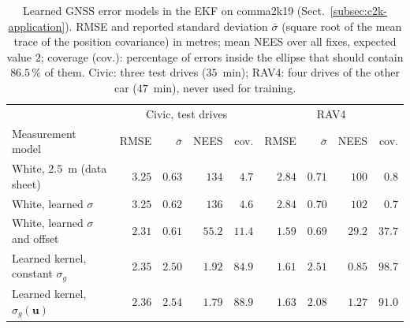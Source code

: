 \documentclass[graybox,envcountchap]{style/SNmono}
\begin{document}
\begin{table}[!t]
\centering
\footnotesize
\setlength{\tabcolsep}{3.5pt}
\caption{Learned GNSS error models in the EKF on comma2k19 (Sect.~\ref{subsec:c2k-application}). RMSE and reported standard deviation $\bar\sigma$ (square root of the mean trace of the position covariance) in metres; mean NEES over all fixes, expected value $2$; coverage (cov.): percentage of errors inside the ellipse that should contain $86.5\,\%$ of them. Civic: three test drives ($35$~min); RAV4: four drives of the other car ($47$~min), never used for training.}
\label{tab:c2k-results}
\begin{tabular}{lrrrrrrrr}
\hline
 & \multicolumn{4}{c}{Civic, test drives} & \multicolumn{4}{c}{RAV4} \\
Measurement model & RMSE & $\bar\sigma$ & NEES & cov. & RMSE & $\bar\sigma$ & NEES & cov. \\
\hline
White, $2.5$~m (data sheet) & $3.25$ & $0.63$ & $134$ & $4.7$ & $2.84$ & $0.71$ & $100$ & $0.8$ \\
White, learned $\sigma$ & $3.25$ & $0.62$ & $136$ & $4.6$ & $2.84$ & $0.70$ & $102$ & $0.7$ \\
White, learned $\sigma$ and offset & $2.31$ & $0.61$ & $55.2$ & $11.4$ & $1.59$ & $0.69$ & $29.2$ & $37.7$ \\
Learned kernel, constant $\sigma_g$ & $2.35$ & $2.50$ & $1.92$ & $84.9$ & $1.61$ & $2.51$ & $0.85$ & $98.7$ \\
Learned kernel, $\sigma_g(\mathbf{u})$ & $2.36$ & $2.54$ & $1.79$ & $88.9$ & $1.63$ & $2.08$ & $1.27$ & $91.0$ \\
\hline
\end{tabular}
\end{table}
\end{document}
